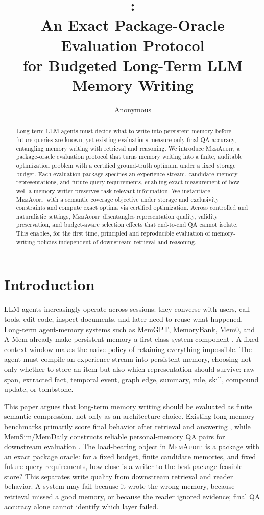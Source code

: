 \documentclass{article}
\title{\method:\\
An Exact Package-Oracle Evaluation Protocol\\
for Budgeted Long-Term LLM Memory Writing}
\author{Anonymous}
\date{}
\theoremstyle{remark}
\theoremstyle{plain}
\newcommand{\method}{\textsc{MemAudit}}
\begin{document}
\maketitle

\begin{abstract}
Long-term LLM agents must decide what to write into persistent memory before future queries are known, yet existing evaluations measure only final QA accuracy, entangling memory writing with retrieval and reasoning. We introduce \method, a package-oracle evaluation protocol that turns memory writing into a finite, auditable optimization problem with a certified ground-truth optimum under a fixed storage budget. Each evaluation package specifies an experience stream, candidate memory representations, and future-query requirements, enabling exact measurement of how well a memory writer preserves task-relevant information. We instantiate \method\ with a semantic coverage objective under storage and exclusivity constraints and compute exact optima via certified optimization. Across controlled and naturalistic settings, \method\ disentangles representation quality, validity preservation, and budget-aware selection effects that end-to-end QA cannot isolate. This enables, for the first time, principled and reproducible evaluation of memory-writing policies independent of downstream retrieval and reasoning.
\end{abstract}

\section{Introduction}

LLM agents increasingly operate across sessions: they converse with users, call tools, edit code, inspect documents, and later need to reuse what happened. Long-term agent-memory systems such as MemGPT, MemoryBank, Mem0, and A-Mem already make persistent memory a first-class system component \cite{packer2023memgpt,zhong2023memorybank,chhikara2025mem0,xu2025amem}. A fixed context window makes the naive policy of retaining everything impossible. The agent must compile an experience stream into persistent memory, choosing not only whether to store an item but also which representation should survive: raw span, extracted fact, temporal event, graph edge, summary, rule, skill, compound update, or tombstone.

This paper argues that long-term memory writing should be evaluated as finite semantic compression, not only as an architecture choice. Existing long-memory benchmarks primarily score final behavior after retrieval and answering \cite{maharana2024locomo,wu2024longmemeval}, while MemSim/MemDaily constructs reliable personal-memory QA pairs for downstream evaluation \cite{zhang2024memsim}. The load-bearing object in \method\ is a package with an exact package oracle: for a fixed budget, finite candidate memories, and fixed future-query requirements, how close is a writer to the best package-feasible store? This separates write quality from downstream retrieval and reader behavior. A system may fail because it wrote the wrong memory, because retrieval missed a good memory, or because the reader ignored evidence; final QA accuracy alone cannot identify which layer failed.
\end{document}
